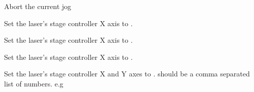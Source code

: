 \documentclass[letterpaper,10pt,english]{sphinxmanual}
\begin{document}
\begin{fulllineitems}
Abort the current jog

\end{fulllineitems}



\begin{fulllineitems}
Set the laser's stage controller X axis to .

\end{fulllineitems}



\begin{fulllineitems}
Set the laser's stage controller X axis to .

\end{fulllineitems}



\begin{fulllineitems}
Set the laser's stage controller X axis to .

\end{fulllineitems}



\begin{fulllineitems}
Set the laser's stage controller X and Y axes to .  should be a comma separated list of numbers.
e.g 

\end{fulllineitems}



\begin{fulllineitems}
\end{fulllineitems}



\begin{fulllineitems}
\end{fulllineitems}



\begin{fulllineitems}
\end{fulllineitems}



\begin{fulllineitems}
\end{fulllineitems}
\end{document}
